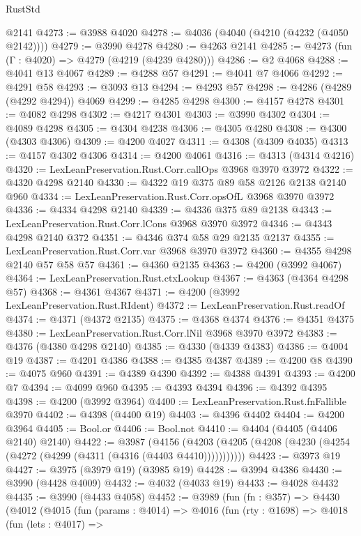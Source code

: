 \begin{lexlean}{RustStd}
\begin{coremodule}
    @2141
@4273 := @3988 @4020
@4278 := @4036 (@4040 (@4210 (@4232 (@4050 @2142))))
@4279 := @3990 @4278
@4280 := @4263 @2141
@4285 := @4273 (fun (Γ : @4020) => @4279 (@4219 (@4239 @4280)))
@4286 := @2 @4068
@4288 := @4041 @13 @4067
@4289 := @4288 @57
@4291 := @4041 @7 @4066
@4292 := @4291 @58
@4293 := @3093 @13
@4294 := @4293 @57
@4298 := @4286 (@4289 (@4292 @4294)) @4069
@4299 := @4285 @4298
@4300 := @4157 @4278
@4301 := @4082 @4298
@4302 := @4217 @4301
@4303 := @3990 @4302
@4304 := @4089 @4298
@4305 := @4304 @4238
@4306 := @4305 @4280
@4308 := @4300 (@4303 @4306)
@4309 := @4200 @4027
@4311 := @4308 (@4309 @4035)
@4313 := @4157 @4302 @4306
@4314 := @4200 @4061
@4316 := @4313 (@4314 @4216)
@4320 := LexLeanPreservation.Rust.Corr.callOps @3968 @3970 @3972
@4322 := @4320 @4298 @2140
@4330 := @4322 @19 @375 @89 @58 @2126 @2138 @2140 @960
@4334 := LexLeanPreservation.Rust.Corr.opsOfL @3968 @3970 @3972
@4336 := @4334 @4298 @2140
@4339 := @4336 @375 @89 @2138
@4343 := LexLeanPreservation.Rust.Corr.lCons @3968 @3970 @3972
@4346 := @4343 @4298 @2140 @372
@4351 := @4346 @374 @58 @29 @2135 @2137
@4355 := LexLeanPreservation.Rust.Corr.var @3968 @3970 @3972
@4360 := @4355 @4298 @2140 @57 @58 @57
@4361 := @4360 @2135
@4363 := @4200 (@3992 @4067)
@4364 := LexLeanPreservation.Rust.ctxLookup
@4367 := @4363 (@4364 @4298 @57)
@4368 := @4361 @4367
@4371 := @4200 (@3992 LexLeanPreservation.Rust.RIdent)
@4372 := LexLeanPreservation.Rust.readOf
@4374 := @4371 (@4372 @2135)
@4375 := @4368 @4374
@4376 := @4351 @4375
@4380 := LexLeanPreservation.Rust.Corr.lNil @3968 @3970 @3972
@4383 := @4376 (@4380 @4298 @2140)
@4385 := @4330 (@4339 @4383)
@4386 := @4004 @19
@4387 := @4201 @4386
@4388 := @4385 @4387
@4389 := @4200 @8
@4390 := @4075 @960
@4391 := @4389 @4390
@4392 := @4388 @4391
@4393 := @4200 @7
@4394 := @4099 @960
@4395 := @4393 @4394
@4396 := @4392 @4395
@4398 := @4200 (@3992 @3964)
@4400 := LexLeanPreservation.Rust.fnFallible @3970
@4402 := @4398 (@4400 @19)
@4403 := @4396 @4402
@4404 := @4200 @3964
@4405 := Bool.or
@4406 := Bool.not
@4410 := @4404 (@4405 (@4406 @2140) @2140)
@4422 := @3987
    (@4156 (@4203 (@4205 (@4208 (@4230 (@4254 (@4272 (@4299 (@4311 (@4316 (@4403 @4410)))))))))))
@4423 := @3973 @19
@4427 := @3975 (@3979 @19) (@3985 @19)
@4428 := @3994 @4386
@4430 := @3990 (@4428 @4009)
@4432 := @4032 (@4033 @19)
@4433 := @4028 @4432
@4435 := @3990 (@4433 @4058)
@4452 := @3989
    (fun (fn : @357) =>
    @4430
      (@4012
        (@4015
          (fun (params : @4014) =>
          @4016
            (fun (rty : @1698) =>
            @4018
              (fun (lets : @4017) =>

\end{coremodule}
\end{lexlean}
